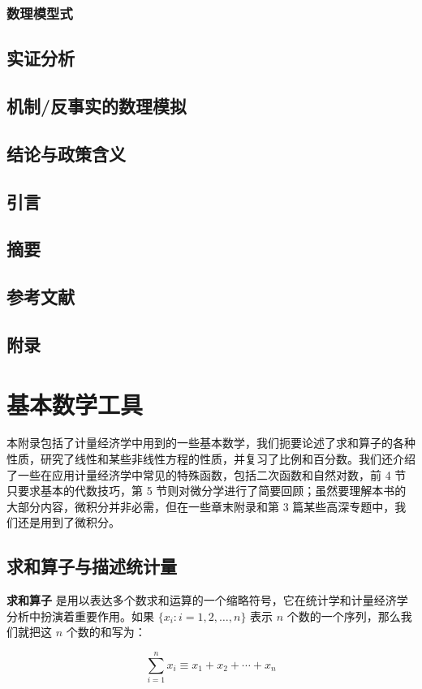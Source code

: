 \documentclass[cn,12pt,math=newtx,citestyle=gb7714-2015,bibstyle=gb7714-2015]{elegantbook}
\begin{document}
	\subsection{数理模型式}
	
	
	\section{实证分析}
	
	
	\section{机制/反事实的数理模拟}
	
	\section{结论与政策含义}
	
	\section{引言}
	
	\section{摘要}
	
	
	\section{参考文献}
	
	\section{附录}
	
	
	
	\nocite{*} 
	\printbibliography
	\appendix
	
	\chapter{基本数学工具}
	
	
	本附录包括了计量经济学中用到的一些基本数学，我们扼要论述了求和算子的各种性质，研究了线性和某些非线性方程的性质，并复习了比例和百分数。我们还介绍了一些在应用计量经济学中常见的特殊函数，包括二次函数和自然对数，前 4 节只要求基本的代数技巧，第 5 节则对微分学进行了简要回顾；虽然要理解本书的大部分内容，微积分并非必需，但在一些章末附录和第 3 篇某些高深专题中，我们还是用到了微积分。
	
	\section{求和算子与描述统计量}
	
	\textbf{求和算子} 是用以表达多个数求和运算的一个缩略符号，它在统计学和计量经济学分析中扮演着重要作用。如果 $\{x_i: i=1, 2, \ldots, n\}$ 表示 $n$ 个数的一个序列，那么我们就把这 $n$ 个数的和写为：
	
	\begin{equation}
		\sum_{i=1}^n x_i \equiv x_1 + x_2 +\cdots + x_n
	\end{equation}
	
	
	
\end{document}
